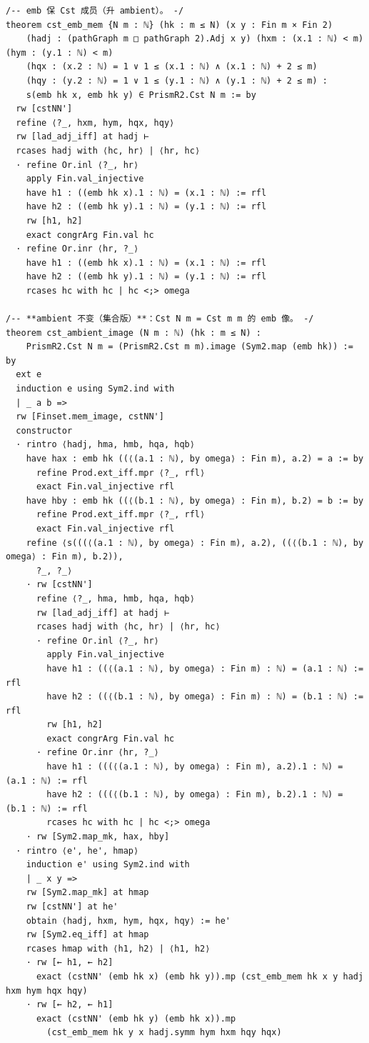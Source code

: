 \documentclass[11pt]{article}
\begin{document}
\begin{lstlisting}
/-- emb 保 Cst 成员（升 ambient）。 -/
theorem cst_emb_mem {N m : ℕ} (hk : m ≤ N) (x y : Fin m × Fin 2)
    (hadj : (pathGraph m □ pathGraph 2).Adj x y) (hxm : (x.1 : ℕ) < m) (hym : (y.1 : ℕ) < m)
    (hqx : (x.2 : ℕ) = 1 ∨ 1 ≤ (x.1 : ℕ) ∧ (x.1 : ℕ) + 2 ≤ m)
    (hqy : (y.2 : ℕ) = 1 ∨ 1 ≤ (y.1 : ℕ) ∧ (y.1 : ℕ) + 2 ≤ m) :
    s(emb hk x, emb hk y) ∈ PrismR2.Cst N m := by
  rw [cstNN']
  refine ⟨?_, hxm, hym, hqx, hqy⟩
  rw [lad_adj_iff] at hadj ⊢
  rcases hadj with ⟨hc, hr⟩ | ⟨hr, hc⟩
  · refine Or.inl ⟨?_, hr⟩
    apply Fin.val_injective
    have h1 : ((emb hk x).1 : ℕ) = (x.1 : ℕ) := rfl
    have h2 : ((emb hk y).1 : ℕ) = (y.1 : ℕ) := rfl
    rw [h1, h2]
    exact congrArg Fin.val hc
  · refine Or.inr ⟨hr, ?_⟩
    have h1 : ((emb hk x).1 : ℕ) = (x.1 : ℕ) := rfl
    have h2 : ((emb hk y).1 : ℕ) = (y.1 : ℕ) := rfl
    rcases hc with hc | hc <;> omega

/-- **ambient 不变（集合版）**：Cst N m = Cst m m 的 emb 像。 -/
theorem cst_ambient_image (N m : ℕ) (hk : m ≤ N) :
    PrismR2.Cst N m = (PrismR2.Cst m m).image (Sym2.map (emb hk)) := by
  ext e
  induction e using Sym2.ind with
  | _ a b =>
  rw [Finset.mem_image, cstNN']
  constructor
  · rintro ⟨hadj, hma, hmb, hqa, hqb⟩
    have hax : emb hk ((⟨(a.1 : ℕ), by omega⟩ : Fin m), a.2) = a := by
      refine Prod.ext_iff.mpr ⟨?_, rfl⟩
      exact Fin.val_injective rfl
    have hby : emb hk ((⟨(b.1 : ℕ), by omega⟩ : Fin m), b.2) = b := by
      refine Prod.ext_iff.mpr ⟨?_, rfl⟩
      exact Fin.val_injective rfl
    refine ⟨s(((⟨(a.1 : ℕ), by omega⟩ : Fin m), a.2), ((⟨(b.1 : ℕ), by omega⟩ : Fin m), b.2)),
      ?_, ?_⟩
    · rw [cstNN']
      refine ⟨?_, hma, hmb, hqa, hqb⟩
      rw [lad_adj_iff] at hadj ⊢
      rcases hadj with ⟨hc, hr⟩ | ⟨hr, hc⟩
      · refine Or.inl ⟨?_, hr⟩
        apply Fin.val_injective
        have h1 : ((⟨(a.1 : ℕ), by omega⟩ : Fin m) : ℕ) = (a.1 : ℕ) := rfl
        have h2 : ((⟨(b.1 : ℕ), by omega⟩ : Fin m) : ℕ) = (b.1 : ℕ) := rfl
        rw [h1, h2]
        exact congrArg Fin.val hc
      · refine Or.inr ⟨hr, ?_⟩
        have h1 : (((⟨(a.1 : ℕ), by omega⟩ : Fin m), a.2).1 : ℕ) = (a.1 : ℕ) := rfl
        have h2 : (((⟨(b.1 : ℕ), by omega⟩ : Fin m), b.2).1 : ℕ) = (b.1 : ℕ) := rfl
        rcases hc with hc | hc <;> omega
    · rw [Sym2.map_mk, hax, hby]
  · rintro ⟨e', he', hmap⟩
    induction e' using Sym2.ind with
    | _ x y =>
    rw [Sym2.map_mk] at hmap
    rw [cstNN'] at he'
    obtain ⟨hadj, hxm, hym, hqx, hqy⟩ := he'
    rw [Sym2.eq_iff] at hmap
    rcases hmap with ⟨h1, h2⟩ | ⟨h1, h2⟩
    · rw [← h1, ← h2]
      exact (cstNN' (emb hk x) (emb hk y)).mp (cst_emb_mem hk x y hadj hxm hym hqx hqy)
    · rw [← h2, ← h1]
      exact (cstNN' (emb hk y) (emb hk x)).mp
        (cst_emb_mem hk y x hadj.symm hym hxm hqy hqx)


\end{lstlisting}
\end{document}
